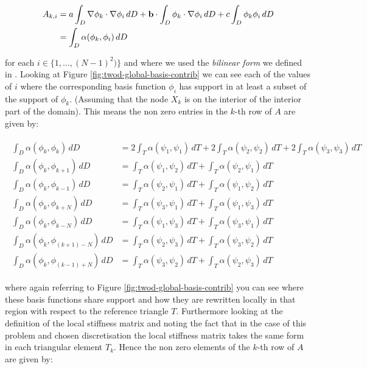 \begin{align}
  \begin{split}
    A_{k,i} &= a\int_D\nabla\phi_k\cdot\nabla\phi_i\, dD
            + \mathbf{b} \cdot \int_D\phi_k\cdot\nabla\phi_i\, dD
            + c\int_D\phi_k\phi_i\, dD \\
            &= \int_D\alpha(\phi_k,\phi_i)\, dD
  \end{split}
\end{align}

for each $i \in \{1,\ldots,(N-1)^2)\}$ and where we used the \textit{bilinear
form} we defined in . Looking at Figure
\ref{fig:twod-global-basis-contrib} we can see each of the values of $i$ where
the corresponding basis function $\phi_i$ has support in at least a subset of
the support of $\phi_k$. (Assuming that the node $X_k$ is on the interior of
the interior part of the domain).  This means the non zero entries in the
$k$-th row of $A$ are given by:

\begin{align}
  \begin{split}
      \int_D\alpha(\phi_k,\phi_k)\, dD
        &= 2\int_T\alpha(\psi_1,\psi_1)\, dT + 2\int_T\alpha(\psi_2,\psi_2)\, dT
         + 2\int_T\alpha(\psi_3,\psi_3)\, dT \\
      \int_D\alpha(\phi_k,\phi_{k+1})\, dD
          &= \int_T\alpha(\psi_1,\psi_2)\, dT + \int_T\alpha(\psi_2,\psi_1)\, dT \\
      \int_D\alpha(\phi_k,\phi_{k-1})\, dD
          &= \int_T\alpha(\psi_2,\psi_1)\, dT + \int_T\alpha(\psi_1,\psi_2)\, dT \\
      \int_D\alpha(\phi_k,\phi_{k+N})\, dD
          &= \int_T\alpha(\psi_3,\psi_1)\, dT + \int_T\alpha(\psi_1,\psi_3)\, dT \\
      \int_D\alpha(\phi_k,\phi_{k-N})\, dD
          &= \int_T\alpha(\psi_1,\psi_3)\, dT + \int_T\alpha(\psi_3,\psi_1)\, dT \\
      \int_D\alpha(\phi_k,\phi_{(k+1) - N})\, dD
          &= \int_T\alpha(\psi_2,\psi_3)\, dT + \int_T\alpha(\psi_3,\psi_2)\, dT \\
      \int_D\alpha(\phi_k,\phi_{(k-1) + N})\, dD
          &= \int_T\alpha(\psi_3,\psi_2)\, dT + \int_T\alpha(\psi_2,\psi_3)\, dT
  \end{split}
\end{align}

where again referring to Figure \ref{fig:twod-global-basis-contrib} you can see
where these basis functions share support and how they are rewritten locally in
that region with respect to the reference triangle $T$. Furthermore looking at
the definition of the local stiffness matrix 
and noting the fact that in the case of this problem and chosen discretisation
the local stiffness matrix takes the same form in each triangular element
$T_k$. Hence the non zero elements of the $k$-th row of $A$ are given by:

